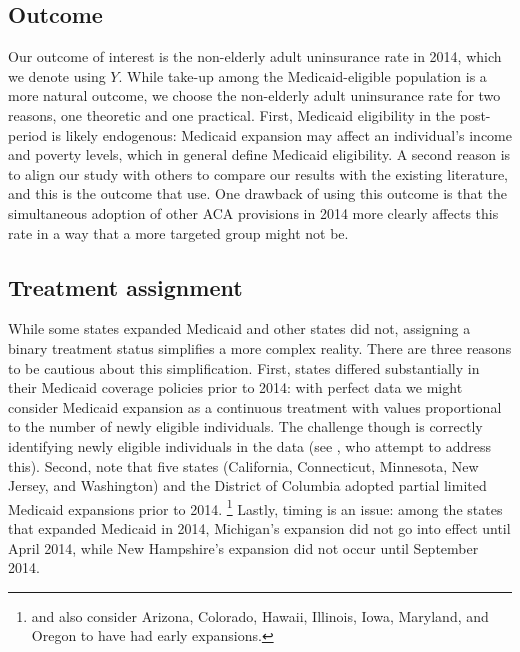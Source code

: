 \documentclass{article}
\begin{document}
\subsection{Outcome}

Our outcome of interest is the non-elderly adult uninsurance rate in 2014, which we denote using $Y$. While take-up among the Medicaid-eligible population is a more natural outcome, we choose the non-elderly adult uninsurance rate for two reasons, one theoretic and one practical. First, Medicaid eligibility in the post-period is likely endogenous: Medicaid expansion may affect an individual's income and poverty levels, which in general define Medicaid eligibility. A second reason is to align our study with others to compare our results with the existing literature, and this is the outcome that \cite{courtemanche2017early} use. One drawback of using this outcome is that the simultaneous adoption of other ACA provisions in 2014 more clearly affects this rate in a way that a more targeted group might not be.

\subsection{Treatment assignment} \label{sssec:txassign}

While some states expanded Medicaid and other states did not, assigning a binary treatment status simplifies a more complex reality. There are three reasons to be cautious about this simplification. First, states differed substantially in their Medicaid coverage policies prior to 2014: with perfect data we might consider Medicaid expansion as a continuous treatment with values proportional to the number of newly eligible individuals. The challenge though is correctly identifying newly eligible individuals in the data (see \cite{frean2017premium}, who attempt to address this). Second, \cite{frean2017premium} note that five states (California, Connecticut, Minnesota, New Jersey, and Washington) and the District of Columbia adopted partial limited Medicaid expansions prior to 2014. \footnote{\cite{kaestner2017effects} and \cite{courtemanche2017early} also consider Arizona, Colorado, Hawaii, Illinois, Iowa, Maryland, and Oregon to have had early expansions.} Lastly, timing is an issue: among the states that expanded Medicaid in 2014, Michigan's expansion did not go into effect until April 2014, while New Hampshire's expansion did not occur until September 2014.
\end{document}
